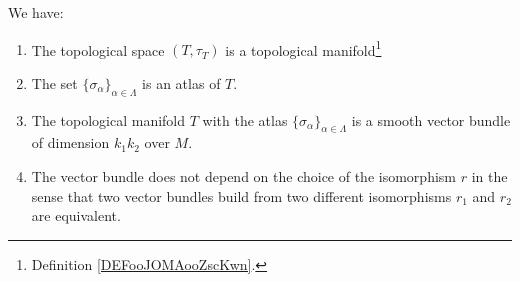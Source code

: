 \begin{propositionDef}
	We have:
	\begin{enumerate}
		\item		\label{ITEMooRALUooFvLQaV}
		      The topological space \( (T,\tau_T)\) is a topological manifold\footnote{Definition \ref{DEFooJOMAooZscKwn}.}
		\item
		      The set \( \{ \sigma_{\alpha} \}_{\alpha\in\Lambda}\) is an atlas of \( T\).
		\item
		      The topological manifold \( T\) with the atlas \( \{ \sigma_{\alpha} \}_{\alpha\in \Lambda}\) is a smooth vector bundle of dimension \( k_1k_2\) over \( M\).
		\item
		      The vector bundle does not depend on the choice of the isomorphism \( r\) in the sense that two vector bundles build from two different isomorphisms \( r_1\) and \( r_2\) are equivalent.
	\end{enumerate}
\end{propositionDef}

